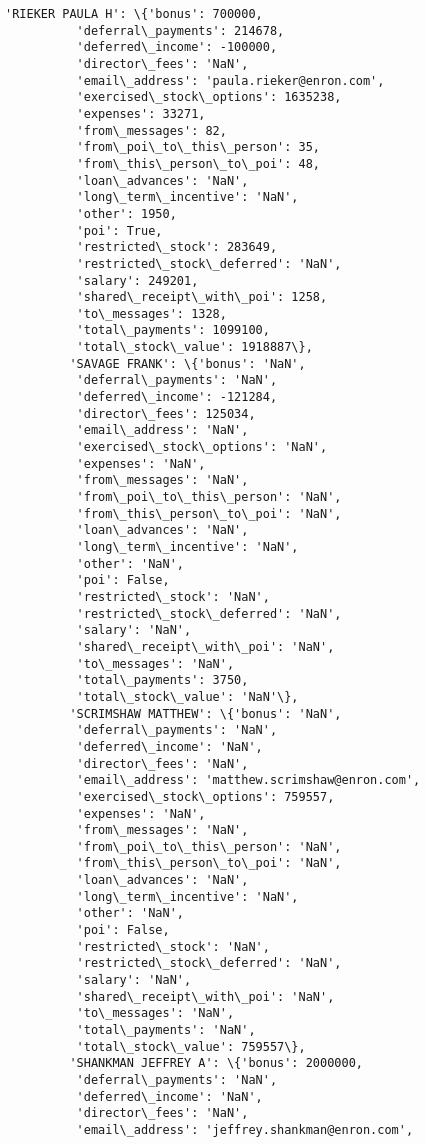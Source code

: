 \documentclass[11pt]{article}
\begin{document}
\begin{Verbatim}[commandchars=\\\{\}]
         'RIEKER PAULA H': \{'bonus': 700000,
          'deferral\_payments': 214678,
          'deferred\_income': -100000,
          'director\_fees': 'NaN',
          'email\_address': 'paula.rieker@enron.com',
          'exercised\_stock\_options': 1635238,
          'expenses': 33271,
          'from\_messages': 82,
          'from\_poi\_to\_this\_person': 35,
          'from\_this\_person\_to\_poi': 48,
          'loan\_advances': 'NaN',
          'long\_term\_incentive': 'NaN',
          'other': 1950,
          'poi': True,
          'restricted\_stock': 283649,
          'restricted\_stock\_deferred': 'NaN',
          'salary': 249201,
          'shared\_receipt\_with\_poi': 1258,
          'to\_messages': 1328,
          'total\_payments': 1099100,
          'total\_stock\_value': 1918887\},
         'SAVAGE FRANK': \{'bonus': 'NaN',
          'deferral\_payments': 'NaN',
          'deferred\_income': -121284,
          'director\_fees': 125034,
          'email\_address': 'NaN',
          'exercised\_stock\_options': 'NaN',
          'expenses': 'NaN',
          'from\_messages': 'NaN',
          'from\_poi\_to\_this\_person': 'NaN',
          'from\_this\_person\_to\_poi': 'NaN',
          'loan\_advances': 'NaN',
          'long\_term\_incentive': 'NaN',
          'other': 'NaN',
          'poi': False,
          'restricted\_stock': 'NaN',
          'restricted\_stock\_deferred': 'NaN',
          'salary': 'NaN',
          'shared\_receipt\_with\_poi': 'NaN',
          'to\_messages': 'NaN',
          'total\_payments': 3750,
          'total\_stock\_value': 'NaN'\},
         'SCRIMSHAW MATTHEW': \{'bonus': 'NaN',
          'deferral\_payments': 'NaN',
          'deferred\_income': 'NaN',
          'director\_fees': 'NaN',
          'email\_address': 'matthew.scrimshaw@enron.com',
          'exercised\_stock\_options': 759557,
          'expenses': 'NaN',
          'from\_messages': 'NaN',
          'from\_poi\_to\_this\_person': 'NaN',
          'from\_this\_person\_to\_poi': 'NaN',
          'loan\_advances': 'NaN',
          'long\_term\_incentive': 'NaN',
          'other': 'NaN',
          'poi': False,
          'restricted\_stock': 'NaN',
          'restricted\_stock\_deferred': 'NaN',
          'salary': 'NaN',
          'shared\_receipt\_with\_poi': 'NaN',
          'to\_messages': 'NaN',
          'total\_payments': 'NaN',
          'total\_stock\_value': 759557\},
         'SHANKMAN JEFFREY A': \{'bonus': 2000000,
          'deferral\_payments': 'NaN',
          'deferred\_income': 'NaN',
          'director\_fees': 'NaN',
          'email\_address': 'jeffrey.shankman@enron.com',

\end{Verbatim}
\end{document}
